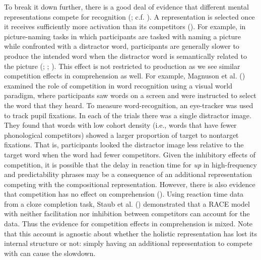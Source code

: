 \documentclass[
  12pt,
  letterpaper,
]{scrreport}
\begin{document}
To break it down further, there is a good deal of evidence that
different mental representations compete for recognition
(; c.f.
).
A representation is selected once it receives sufficiently more
activation than its competitors
(). For example, in picture-naming tasks in which
participants are tasked with naming a picture while confronted with a
distractor word, participants are generally slower to produce the
intended word when the distractor word is semantically related to the
picture
(;
;
). This effect is not restricted to production as we
see similar competition effects in comprehension as well. For example,
Magnuson et al.
() examined
the role of competition in word recognition using a visual world
paradigm, where participants saw words on a screen and were instructed
to select the word that they heard. To measure word-recognition, an
eye-tracker was used to track pupil fixations. In each of the trials
there was a single distractor image. They found that words with low
cohort density (i.e., words that have fewer phonological competitors)
showed a larger proportion of target to nontarget fixations. That is,
participants looked the distractor image less relative to the target
word when the word had fewer competitors. Given the inhibitory effects
of competition, it is possible that the delay in reaction time for
\emph{up} in high-frequency and predictability phrases may be a
consequence of an additional representation competing with the
compositional representation. However, there is also evidence that
competition has no effect on comprehension
().
Using reaction time data from a cloze completion task, Staub et al.
() demonstrated
that a RACE model with neither facilitation nor inhibition between
competitors can account for the data. Thus the evidence for competition
effects in comprehension is mixed. Note that this account is agnostic
about whether the holistic representation has lost its internal
structure or not: simply having an additional representation to compete
with can cause the slowdown.
\end{document}
